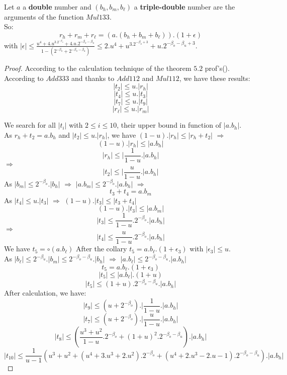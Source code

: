 \begin{theo}

Let $a$ a \textbf{double} number and $(b_h,b_m,b_{\ell})$ a \textbf{triple-double} number are the arguments of the function $Mul133$.\\
So:\\
$$r_h +r_m +r_{\ell} = (a. (b_h+ b_m +b_{\ell})).(1+\epsilon)$$ with $\lvert \epsilon \rvert \le \frac{u^4 + 4.u^3.2^{-\beta_o} + 4.u.2^{-\beta_o - \beta_u}}{1-(2^{-\beta_o} +  2^{-\beta_o -\beta_u})} \le 2.u^4 + u^3.2^{-\beta_o+3} + u.2^{-\beta_o - \beta_u +3}$.
\end{theo}

\begin{proof} \color{-yellow}
According to the calculation technique of the theorem $5.2$ prof's(\cite{lauter2005basic}).\\
According to $Add333$ and thanks to $Add112$ and $Mul112$, we have these results:
$$\lvert t_2 \rvert \le u.\lvert r_h \rvert $$
$$\lvert t_4 \rvert \le u.\lvert t_3 \rvert $$
$$\lvert t_7 \rvert \le u.\lvert t_9 \rvert $$
$$\lvert r_{\ell} \rvert \le u.\lvert r_m \rvert $$

We search for all $ \lvert t_i \rvert $ with $2\le i \le 10$, their upper bound in function of $\lvert a.b_h \rvert$.\\
As $r_h + t_2 = a.b_h$ and $\lvert t_2 \rvert \le u.\lvert r_h \rvert $, we have
$ (1- u). \lvert r_h \rvert \le \lvert r_h + t_2 \rvert$
$\Rightarrow$
$$(1- u). \lvert r_h \rvert \le \lvert a.b_h \rvert$$
$$\lvert r_h \rvert \le \lvert \frac{1}{1-u} .  \lvert a.b_h \rvert$$
$\Rightarrow$
$$\lvert t_2 \rvert \le \lvert \frac{u}{1-u} . \lvert a.b_h \rvert$$
As $\lvert b_m \rvert \le 2^{-\beta_o}.\lvert b_h \rvert$ $\Rightarrow$ $\lvert a.b_m \rvert \le 2^{-\beta_o}.\lvert a.b_h \rvert$ $\Rightarrow$
$$t_3 + t_4 = a.b_m$$
As $\lvert t_4 \rvert \le u.\lvert t_3 \rvert $ $\Rightarrow$ $(1- u). \lvert t_3 \rvert \le \lvert t_3 + t_4 \rvert$
$$(1- u). \lvert t_3 \rvert \le \lvert a.b_m \rvert $$
$$ \lvert t_3 \rvert \le \frac{1}{1-u}.2^{-\beta_o}.\lvert a.b_h \rvert $$
$\Rightarrow$
$$ \lvert t_4 \rvert \le \frac{u}{1-u}.2^{-\beta_o}.\lvert a.b_h \rvert $$
We have $t_5 = \circ(a.b_{\ell})$ After the collary $t_5 = a.b_{\ell}.(1+\epsilon_3)$
with $\lvert \epsilon_3 \rvert \le u$.\\
As $\lvert b_{\ell} \rvert \le 2^{-\beta_u}.\lvert b_m \rvert \le 2^{-\beta_o -\beta_u}.\lvert b_h \rvert $ $\Rightarrow$ $\lvert a.b_{\ell} \rvert \le 2^{-\beta_o -\beta_u}.\lvert a.b_h \rvert$ 
$$t_5 = a.b_{\ell}.(1+\epsilon_3)$$
$$\lvert t_5  \rvert \le \lvert a.b_{\ell} \rvert.(1+u) $$
$$\lvert t_5  \rvert \le (1+u). 2^{-\beta_o -\beta_u}.\lvert a.b_h \rvert $$
After calculation, we have:
$$\lvert t_9 \rvert \le   (u  + 2^{-\beta_o}).\lvert \frac{1}{1-u}. \lvert a.b_h \rvert  $$
$$\lvert t_7 \rvert \le   (u  + 2^{-\beta_o}).\lvert \frac{u}{1-u} .\lvert a.b_h \rvert  $$
$$\lvert t_8 \rvert \le (\frac{u^3+u^2}{1-u}.2^{-\beta_o} + (1+u)^2. 2^{-\beta_o -\beta_u}).\lvert a.b_h \rvert$$
$$\lvert t_{10} \rvert \le \frac{1}{u-1}(u^3+u^2 + (u^4+3.u^3+2.u^2).2^{-\beta_o}+(u^4+2.u^3-2.u-1).2^{-\beta_o - \beta_u}).\lvert a.b_h\rvert $$


\end{proof}
